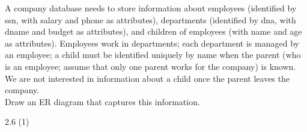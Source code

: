\begin{problem}{2.2}
\begin{solution}
\begin{figure}[H]
{      } \qquad
       \qquad
       \qquad
    \end{figure}
  \end{solution}
\end{problem}

\begin{problem}{2.4}

  A company database needs to store information about employees (identified by ssn, with salary and phone as
  attributes), departments (identified by dna, with dname and budget as attributes), and children of employees (with
  name and age as attributes). Employees work in departments; each department is managed by an employee; a child must be
  identified uniquely by name when the parent (who is an employee; assume that only one parent works for the company) is
  known. We are not interested in information about a child once the parent leaves the company. \\

  \noindent Draw an ER diagram that captures this information.

  \begin{solution}
  \end{solution}
\end{problem}
\begin{problem}{2.6 (1)}
  \begin{solution}
  \end{solution}
\end{problem}
\begin{problem}{2.8}
  \begin{solution}
  \end{solution}
\end{problem}



